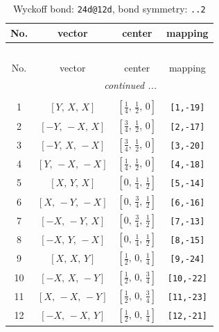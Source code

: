 \documentclass[fleqn,8pt]{jsarticle}
\begin{document}
\begin{longtable}{cccc}
\caption{Wyckoff bond: {\tt 24d@12d}, bond symmetry: {\tt ..2}}
 \\
 \hline \hline
No. & vector & center & mapping \\ \hline \endfirsthead

\multicolumn{3}{l}{\tablename\ \thetable{}} \\
 \hline \hline
No. & vector & center & mapping \\ \hline \endhead

 \hline \hline
\multicolumn{3}{r}{\footnotesize\it continued ...} \\ \endfoot

 \hline \hline
\multicolumn{3}{r}{} \\ \endlastfoot

1 & $\left[ Y,\, X,\, X \right]$ & $\left[ \frac{1}{4},\, \frac{1}{2},\, 0 \right]$ & {\tt [1,-19]} \\ \hline
2 & $\left[ - Y,\, - X,\, X \right]$ & $\left[ \frac{3}{4},\, \frac{1}{2},\, 0 \right]$ & {\tt [2,-17]} \\ \hline
3 & $\left[ - Y,\, X,\, - X \right]$ & $\left[ \frac{3}{4},\, \frac{1}{2},\, 0 \right]$ & {\tt [3,-20]} \\ \hline
4 & $\left[ Y,\, - X,\, - X \right]$ & $\left[ \frac{1}{4},\, \frac{1}{2},\, 0 \right]$ & {\tt [4,-18]} \\ \hline
5 & $\left[ X,\, Y,\, X \right]$ & $\left[ 0,\, \frac{1}{4},\, \frac{1}{2} \right]$ & {\tt [5,-14]} \\ \hline
6 & $\left[ X,\, - Y,\, - X \right]$ & $\left[ 0,\, \frac{3}{4},\, \frac{1}{2} \right]$ & {\tt [6,-16]} \\ \hline
7 & $\left[ - X,\, - Y,\, X \right]$ & $\left[ 0,\, \frac{3}{4},\, \frac{1}{2} \right]$ & {\tt [7,-13]} \\ \hline
8 & $\left[ - X,\, Y,\, - X \right]$ & $\left[ 0,\, \frac{1}{4},\, \frac{1}{2} \right]$ & {\tt [8,-15]} \\ \hline
9 & $\left[ X,\, X,\, Y \right]$ & $\left[ \frac{1}{2},\, 0,\, \frac{1}{4} \right]$ & {\tt [9,-24]} \\ \hline
10 & $\left[ - X,\, X,\, - Y \right]$ & $\left[ \frac{1}{2},\, 0,\, \frac{3}{4} \right]$ & {\tt [10,-22]} \\ \hline
11 & $\left[ X,\, - X,\, - Y \right]$ & $\left[ \frac{1}{2},\, 0,\, \frac{3}{4} \right]$ & {\tt [11,-23]} \\ \hline
12 & $\left[ - X,\, - X,\, Y \right]$ & $\left[ \frac{1}{2},\, 0,\, \frac{1}{4} \right]$ & {\tt [12,-21]} \\
\end{longtable}
\end{document}
